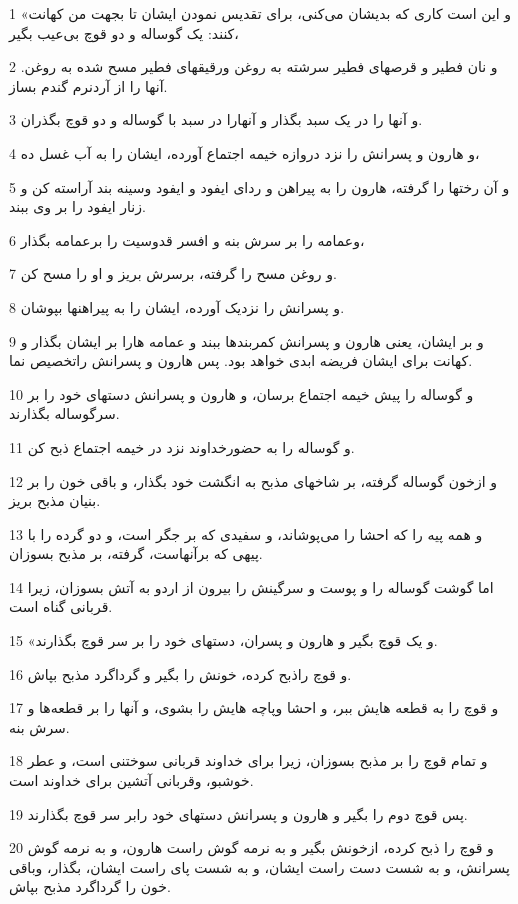 \par 1 «و این است کاری که بدیشان می‌کنی، برای تقدیس نمودن ایشان تا بجهت من کهانت کنند: یک گوساله و دو قوچ بی‌عیب بگیر،
\par 2 و نان فطیر و قرصهای فطیر سرشته به روغن ورقیقهای فطیر مسح شده به روغن. آنها را از آردنرم گندم بساز.
\par 3 و آنها را در یک سبد بگذار و آنهارا در سبد با گوساله و دو قوچ بگذران.
\par 4 و هارون و پسرانش را نزد دروازه خیمه اجتماع آورده، ایشان را به آب غسل ده،
\par 5 و آن رختها را گرفته، هارون را به پیراهن و ردای ایفود و ایفود وسینه بند آراسته کن و زنار ایفود را بر وی ببند.
\par 6 وعمامه را بر سرش بنه و افسر قدوسیت را برعمامه بگذار،
\par 7 و روغن مسح را گرفته، برسرش بریز و او را مسح کن.
\par 8 و پسرانش را نزدیک آورده، ایشان را به پیراهنها بپوشان.
\par 9 و بر ایشان، یعنی هارون و پسرانش کمربندها ببند و عمامه هارا بر ایشان بگذار و کهانت برای ایشان فریضه ابدی خواهد بود. پس هارون و پسرانش راتخصیص نما.
\par 10 و گوساله را پیش خیمه اجتماع برسان، و هارون و پسرانش دستهای خود را بر سرگوساله بگذارند.
\par 11 و گوساله را به حضورخداوند نزد در خیمه اجتماع ذبح کن.
\par 12 و ازخون گوساله گرفته، بر شاخهای مذبح به انگشت خود بگذار، و باقی خون را بر بنیان مذبح بریز.
\par 13 و همه پیه را که احشا را می‌پوشاند، و سفیدی که بر جگر است، و دو گرده را با پیهی که برآنهاست، گرفته، بر مذبح بسوزان.
\par 14 اما گوشت گوساله را و پوست و سرگینش را بیرون از اردو به آتش بسوزان، زیرا قربانی گناه است.
\par 15 «و یک قوچ بگیر و هارون و پسران، دستهای خود را بر سر قوچ بگذارند.
\par 16 و قوچ راذبح کرده، خونش را بگیر و گرداگرد مذبح بپاش.
\par 17 و قوچ را به قطعه هایش ببر، و احشا وپاچه هایش را بشوی، و آنها را بر قطعه‌ها و سرش بنه.
\par 18 و تمام قوچ را بر مذبح بسوزان، زیرا برای خداوند قربانی سوختنی است، و عطر خوشبو، وقربانی آتشین برای خداوند است.
\par 19 پس قوچ دوم را بگیر و هارون و پسرانش دستهای خود رابر سر قوچ بگذارند.
\par 20 و قوچ را ذبح کرده، ازخونش بگیر و به نرمه گوش راست هارون، و به نرمه گوش پسرانش، و به شست دست راست ایشان، و به شست پای راست ایشان، بگذار، وباقی خون را گرداگرد مذبح بپاش.
